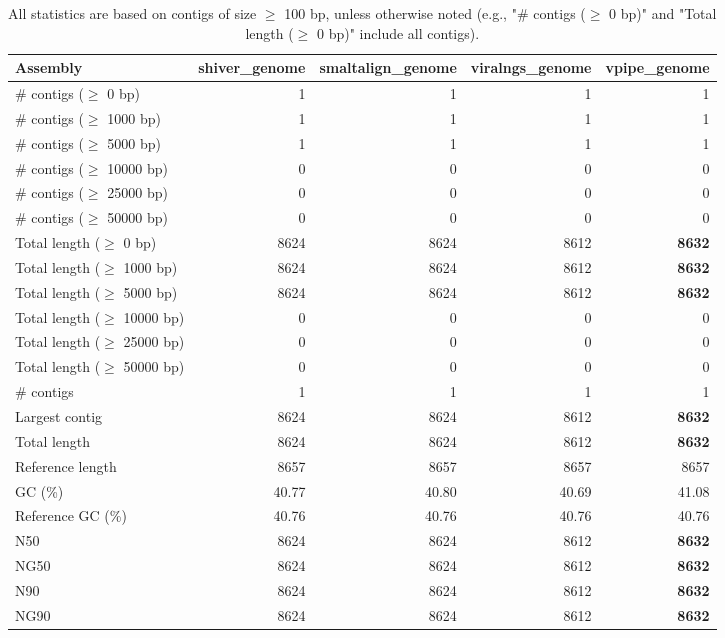 \documentclass[12pt,a4paper]{article}
\begin{document}
\begin{table}[ht]
\begin{center}
\caption{All statistics are based on contigs of size $\geq$ 100 bp, unless otherwise noted (e.g., "\# contigs ($\geq$ 0 bp)" and "Total length ($\geq$ 0 bp)" include all contigs).}
\begin{tabular}{|l*{4}{|r}|}
\hline
Assembly & shiver\_genome & smaltalign\_genome & viralngs\_genome & vpipe\_genome \\ \hline
\# contigs ($\geq$ 0 bp) & 1 & 1 & 1 & 1 \\ \hline
\# contigs ($\geq$ 1000 bp) & 1 & 1 & 1 & 1 \\ \hline
\# contigs ($\geq$ 5000 bp) & 1 & 1 & 1 & 1 \\ \hline
\# contigs ($\geq$ 10000 bp) & 0 & 0 & 0 & 0 \\ \hline
\# contigs ($\geq$ 25000 bp) & 0 & 0 & 0 & 0 \\ \hline
\# contigs ($\geq$ 50000 bp) & 0 & 0 & 0 & 0 \\ \hline
Total length ($\geq$ 0 bp) & 8624 & 8624 & 8612 & {\bf 8632} \\ \hline
Total length ($\geq$ 1000 bp) & 8624 & 8624 & 8612 & {\bf 8632} \\ \hline
Total length ($\geq$ 5000 bp) & 8624 & 8624 & 8612 & {\bf 8632} \\ \hline
Total length ($\geq$ 10000 bp) & 0 & 0 & 0 & 0 \\ \hline
Total length ($\geq$ 25000 bp) & 0 & 0 & 0 & 0 \\ \hline
Total length ($\geq$ 50000 bp) & 0 & 0 & 0 & 0 \\ \hline
\# contigs & 1 & 1 & 1 & 1 \\ \hline
Largest contig & 8624 & 8624 & 8612 & {\bf 8632} \\ \hline
Total length & 8624 & 8624 & 8612 & {\bf 8632} \\ \hline
Reference length & 8657 & 8657 & 8657 & 8657 \\ \hline
GC (\%) & 40.77 & 40.80 & 40.69 & 41.08 \\ \hline
Reference GC (\%) & 40.76 & 40.76 & 40.76 & 40.76 \\ \hline
N50 & 8624 & 8624 & 8612 & {\bf 8632} \\ \hline
NG50 & 8624 & 8624 & 8612 & {\bf 8632} \\ \hline
N90 & 8624 & 8624 & 8612 & {\bf 8632} \\ \hline
NG90 & 8624 & 8624 & 8612 & {\bf 8632} \\ \hline

\end{tabular}
\end{center}
\end{table}
\end{document}
